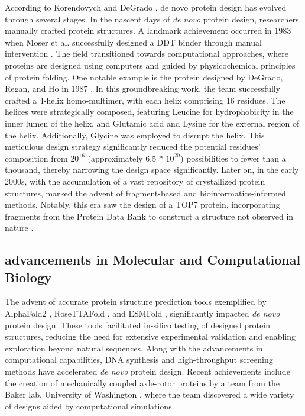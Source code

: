 \documentclass[11pt,a4paper]{article}
\begin{document}
According to Korendovych and DeGrado \cite{korendovych2020novo}, de 
novo protein design has evolved through several stages.
In the nascent days of \emph{de novo} protein design, researchers manually 
crafted protein structures. A landmark achievement occurred in 1983 
when Moser et al. successfully designed a DDT binder through manual 
intervention \cite{moser1983artificial}.
The field transitioned towards computational approaches, where proteins 
are designed using computers and guided by physicochemical principles 
of protein folding. One notable example is the protein designed by 
DeGrado, Regan, and Ho in 1987 \cite{degrado1987design}. In this 
groundbreaking work, the team successfully crafted a 4-helix 
homo-multimer, with each helix comprising 16 residues. The helices were 
strategically composed, featuring Leucine for hydrophobicity in the 
inner lumen of the helix, and Glutamic acid and Lysine for the external 
region of the helix. Additionally, Glycine was employed to disrupt the 
helix. This meticulous design strategy significantly reduced the 
potential residues' composition from $20^{16}$ (approximately 6.5 * $10^
{20}$) possibilities to fewer than a thousand, thereby narrowing the 
design space significantly. 
Later on, in the early 2000s, with the accumulation of a vast repository 
of crystallized protein structures,  marked the advent of 
fragment-based and bioinformatics-informed methods. Notably, this era 
saw the design of a  TOP7 protein, incorporating fragments from the 
Protein Data Bank to construct a structure not observed in nature \cite
{kuhlman2003design}.

\subsection{advancements in Molecular and Computational Biology}

The advent of accurate protein structure prediction tools exemplified 
by AlphaFold2 \cite{jumper2021highly}, RoseTTAFold \cite
{baek2021accurate}, and ESMFold \cite{lin2022language}, significantly 
impacted \emph{de novo} protein design. These tools facilitated in-silico 
testing of designed protein structures, reducing the need for extensive 
experimental validation and enabling exploration beyond natural 
sequences.
Along with the advancements in computational capabilities, DNA synthesis 
and high-throughput screening methods have accelerated \emph{de novo} protein 
design. Recent achievements include the creation of mechanically 
coupled  axle-rotor proteins by a team from the Baker lab, University 
of Washington \cite{courbet2022computational}, where the team 
discovered a wide variety of designs aided by computational simulations.
\end{document}
